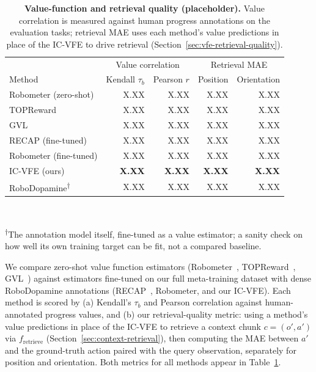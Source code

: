 \begin{table}[t]
    \centering
    \caption{\textbf{Value-function and retrieval quality (placeholder).}
    Value correlation is measured against human progress annotations on the
    \NumEvalTasks{} evaluation tasks; retrieval MAE uses each method's value
    predictions in place of the IC-VFE to drive retrieval
    (Section~\ref{sec:vfe-retrieval-quality}).}
    \label{tab:vfe-retrieval-results}
    \footnotesize
    \begin{tabular}{lrrrr}
        \toprule
        & \multicolumn{2}{c}{Value correlation} & \multicolumn{2}{c}{Retrieval MAE} \\
        Method & Kendall $\tau_b$ & Pearson $r$ & Position & Orientation \\
        \midrule
        Robometer (zero-shot) & X.XX & X.XX & X.XX & X.XX \\
        TOPReward             & X.XX & X.XX & X.XX & X.XX \\
        GVL                   & X.XX & X.XX & X.XX & X.XX \\
        RECAP (fine-tuned)    & X.XX & X.XX & X.XX & X.XX \\
        Robometer (fine-tuned) & X.XX & X.XX & X.XX & X.XX \\
        IC-VFE (ours)         & \textbf{X.XX} & \textbf{X.XX} & \textbf{X.XX} & \textbf{X.XX} \\
        \midrule
        RoboDopamine\textsuperscript{$\dagger$} & X.XX & X.XX & X.XX & X.XX \\
        \bottomrule
    \end{tabular}
    \\[2pt]
    \raggedright\footnotesize\textsuperscript{$\dagger$}The annotation model itself, fine-tuned as a value estimator; a sanity check on how well its own training target can be fit, not a compared baseline.
\end{table}

We compare zero-shot value function estimators (Robometer~\cite{robometer},
TOPReward~\cite{topreward}, GVL~\cite{gvl}) against estimators fine-tuned on
our full meta-training dataset with dense RoboDopamine annotations
(RECAP~\cite{pi06}, Robometer, and our IC-VFE). Each method is scored by (a)
Kendall's $\tau_b$ and Pearson correlation against human-annotated progress
values, and (b) our retrieval-quality metric: using a method's value
predictions in place of the IC-VFE to retrieve a context chunk $c=(o',a')$
via $f_{\text{retrieve}}$ (Section~\ref{sec:context-retrieval}), then
computing the MAE between $a'$ and the ground-truth action paired with the
query observation, separately for position and orientation. Both metrics for
all methods appear in Table~\ref{tab:vfe-retrieval-results}.

